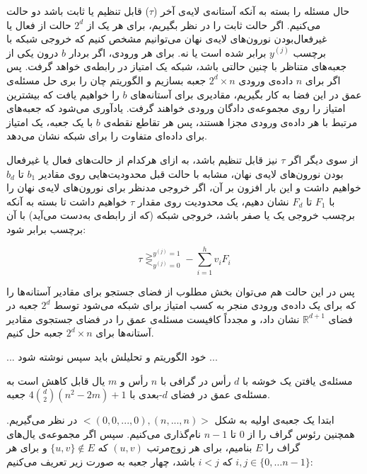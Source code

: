 حال مسئله را بسته به آنکه آستانه‌ی لایه‌ی آخر ($\tau$) قابل تنظیم یا ثابت باشد دو حالت می‌کنیم. اگر حالت ثابت را در نظر بگیریم، برای هر یک از $2^d$ حالت از فعال یا غیرفعال‌بودن نورون‌های لایه‌ی نهان می‌توانیم مشخص کنیم که خروجی شبکه با برچسب
$y^{(j)}$
برابر شده است یا نه. برای هر ورودی، اگر بردار $b$ درون یکی از جعبه‌های متناظر با چنین حالتی باشد، شبکه یک امتیاز در رابطه‌ی  خواهد گرفت. پس اگر برای $n$ داده‌ی ورودی
$2^d \times n$
جعبه بسازیم و الگوریتم چان را بری حل مسئله‌ی عمق در این فضا به کار بگیریم، مقادیری برای آستانه‌های $b$ را خواهیم یافت که بیشترین امتیاز را روی مجموعه‌ی دادگان ورودی خواهند گرفت. یادآوری می‌شود که جعبه‌های مرتبط با هر داده‌ی ورودی مجزا هستند، پس هر تقاطع نقطه‌ی $b$ با یک جعبه، یک امتیاز برای داده‌ای متفاوت را برای شبکه نشان می‌دهد.

از سوی دیگر اگر $\tau$ نیز قابل تنظیم باشد، به ازای هرکدام از حالت‌های فعال یا غیرفعال بودن نورون‌های لایه‌ی نهان، مشابه با حالت قبل محدودیت‌هایی روی مقادیر $b_1$ تا $b_d$ خواهیم داشت و این بار افزون بر آن، اگر خروجی مدنظر برای نورون‌های لایه‌ی نهان را با $F_1$ تا $F_d$ نشان دهیم، یک محدودیت روی مقدار $\tau$ خواهیم داشت تا بسته به آنکه برچسب خروجی یک یا صفر باشد، خروجی شبکه (که از رابطه‌ی  به‌دست می‌آید) با آن برچسب برابر شود:

\begin{equation*}
	\tau \mathop{\gtreqless}_{y^{(j)}=0}^{y^{(j)}=1} -\sum_{i=1}^h v_i F_i
\end{equation*}

پس در این حالت هم می‌توان بخش مطلوب از فضای جستجو برای مقادیر آستانه‌ها را که برای یک داده‌ی ورودی منجر به کسب امتیاز برای شبکه می‌شود توسط $2^d$ جعبه در فضای $\mathbb{R}^{d+1}$ نشان داد، و مجدداً کافیست مسئله‌ی عمق را در فضای جستجوی مقادیر آستانه‌ها برای
$2^d \times n$
جعبه حل کنیم.

... خود الگوریتم و تحلیلش باید سپس نوشته شود ...





مسئله‌ی یافتن یک خوشه با $d$ رأس در گرافی با $n$ رأس و $m$ یال قابل کاهش است به مسئله‌ی عمق در فضای $d$-بعدی با
$4\binom{d}{2}(n^2 - 2m) + 1$
جعبه.

ابتدا یک جعبه‌ی اولیه به شکل
$<(0,0,...,0), (n, ..., n)>$
در نظر می‌گیریم. همچنین رئوس گراف را از $0$ تا $n-1$ نام‌گذاری می‌کنیم. سپس اگر مجموعه‌ی یال‌های گراف را $E$ بنامیم، برای هر زوج‌مرتب $(u,v)$ که $\{u,v\} \notin E$ و برای هر $i, j \in  \{0, \dots n-1\}$ که $i<j$ باشد، چهار جعبه به صورت زیر تعریف می‌کنیم:

